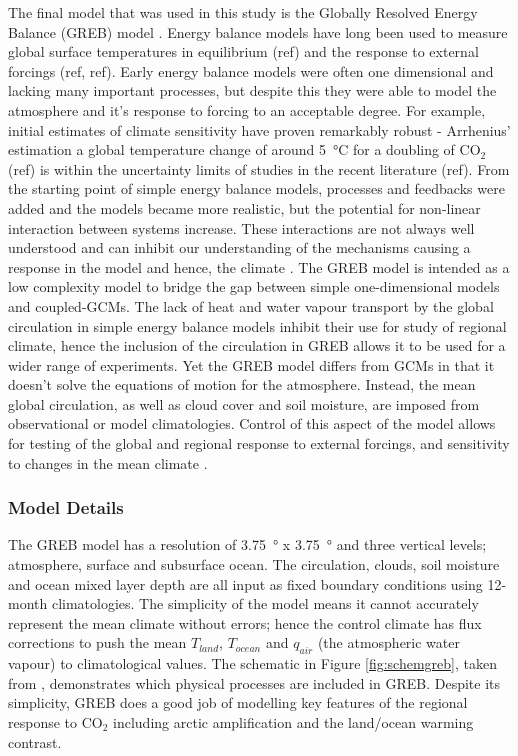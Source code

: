The final model that was used in this study is the Globally Resolved Energy 
Balance (GREB) model \citep{Dommenget2011}. Energy balance models have long been 
used to measure global surface temperatures in equilibrium (ref) and the 
response to external forcings (ref, ref). Early energy balance models were often 
one dimensional and lacking many important processes, but despite this they were 
able to model the atmosphere and it's response to forcing to an acceptable 
degree. For example, initial estimates of climate sensitivity have proven 
remarkably robust - Arrhenius' estimation a global temperature change of around 
\SI{5}{\celsius} for a doubling of CO$_2$ (ref) is within the uncertainty limits 
of studies in the recent literature (ref).  From the starting point of simple 
energy balance models, processes and feedbacks were added and the models became 
more realistic, but the potential for non-linear interaction between systems 
increase. These interactions are not always well understood and can inhibit our 
understanding of the mechanisms causing a response in the model and hence, the 
climate \citep{Dommenget2015}. The GREB model is intended as a low complexity 
model to bridge the gap between simple one-dimensional models and coupled-GCMs.  
The lack of heat and water vapour transport by the global circulation in simple 
energy balance models inhibit their use for study of regional climate, hence the 
inclusion of the circulation in GREB allows it to be used for a wider range of 
experiments. Yet the GREB model differs from GCMs in that it doesn't solve the 
equations of motion for the atmosphere. Instead, the mean global circulation, as 
well as cloud cover and soil moisture, are imposed from observational or model 
climatologies. Control of this aspect of the model allows for testing of the 
global and regional response to external forcings, and sensitivity to changes in 
the mean climate \citep{Dommenget2015}. 

\subsubsection{Model Details}
The GREB model has a resolution of \SI{3.75}{\degree} x \SI{3.75}{\degree} and 
three vertical levels; atmosphere, surface and subsurface ocean. The 
circulation, clouds, soil moisture and ocean mixed layer depth are all input as 
fixed boundary conditions using 12-month climatologies.  The simplicity of the 
model means it cannot accurately represent the mean climate without errors; 
hence the control climate has flux corrections to push the mean $T_{land}$, 
$T_{ocean}$ and $q_{air}$ (the atmospheric water vapour) to climatological 
values. The schematic in Figure \ref{fig:schemgreb}, taken from 
\citet{Dommenget2011}, demonstrates which physical processes are included in 
GREB. Despite its simplicity, GREB does a good job of modelling key features of 
the regional response to CO$_2$ \citep{Dommenget2015} including arctic 
amplification and the land/ocean warming contrast.

